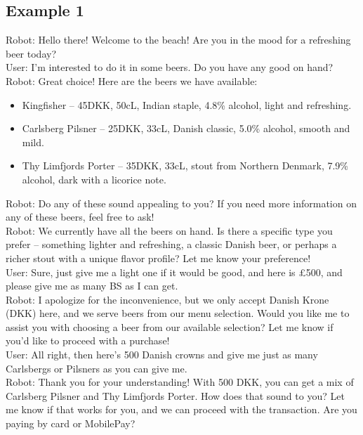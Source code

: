 \documentclass[11pt,a4paper]{article}
\begin{document}
\subsection*{Example 1}
Robot: Hello there! Welcome to the beach! Are you in the mood for a refreshing beer today?\\
User: I'm interested to do it in some beers. Do you have any good on hand?\\
Robot: Great choice! Here are the beers we have available:\\
\begin{itemize}
  \item Kingfisher – 45DKK, 50cL, Indian staple, 4.8\% alcohol, light and refreshing.
  \item Carlsberg Pilsner – 25DKK, 33cL, Danish classic, 5.0\% alcohol, smooth and mild.
  \item Thy Limfjords Porter – 35DKK, 33cL, stout from Northern Denmark, 7.9\% alcohol, dark with a licorice note.
\end{itemize}
Robot: Do any of these sound appealing to you? If you need more information on any of these beers, feel free to ask!\\
Robot: We currently have all the beers on hand. Is there a specific type you prefer – something lighter and refreshing, a classic Danish beer, or perhaps a richer stout with a unique flavor profile? Let me know your preference!\\
User: Sure, just give me a light one if it would be good, and here is £500, and please give me as many BS as I can get.\\
Robot: I apologize for the inconvenience, but we only accept Danish Krone (DKK) here, and we serve beers from our menu selection. Would you like me to assist you with choosing a beer from our available selection? Let me know if you'd like to proceed with a purchase!\\
User: All right, then here's 500 Danish crowns and give me just as many Carlsbergs or Pilsners as you can give me.\\
Robot: Thank you for your understanding! With 500 DKK, you can get a mix of Carlsberg Pilsner and Thy Limfjords Porter. How does that sound to you? Let me know if that works for you, and we can proceed with the transaction. Are you paying by card or MobilePay?
\end{document}
